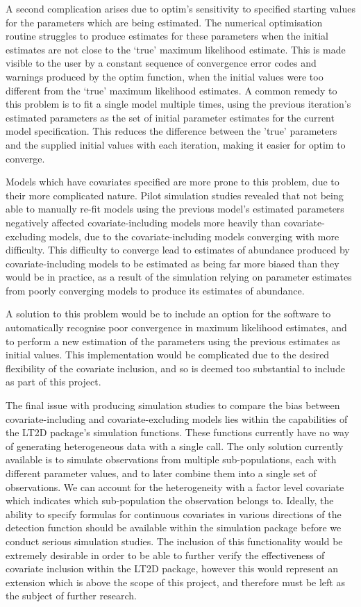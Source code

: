 \documentclass[11pt]{article}
\begin{document}
\begin{multicols}{2}
A second complication arises due to optim's sensitivity to specified starting values for the parameters which are being estimated. The numerical optimisation routine struggles to produce estimates for these parameters when the initial estimates are not close to the `true' maximum likelihood estimate. This is made visible to the user by a constant sequence of convergence error codes and warnings produced by the optim function, when the initial values were too different from the `true' maximum likelihood estimates. A common remedy to this problem is to fit a single model multiple times, using the previous iteration's estimated parameters as the set of initial parameter estimates for the current model specification. This reduces the difference between the 'true' parameters and the supplied initial values with each iteration, making it easier for optim to converge.

Models which have covariates specified are more prone to this problem, due to their more complicated nature. Pilot simulation studies revealed that not being able to manually re-fit models using the previous model's estimated parameters negatively affected covariate-including models more heavily than covariate-excluding models, due to the covariate-including models converging with more difficulty. This difficulty to converge lead to estimates of abundance produced by covariate-including models to be estimated as being far more biased than they would be in practice, as a result of the simulation relying on parameter estimates from poorly converging models to produce its estimates of abundance.

A solution to this problem would be to include an option for the software to automatically recognise poor convergence in maximum likelihood estimates, and to perform a new estimation of the parameters using the previous estimates as initial values. This implementation would be complicated due to the desired flexibility of the covariate inclusion, and so is deemed too substantial to include as part of this project.

The final issue with producing simulation studies to compare the bias between covariate-including and covariate-excluding models lies within the capabilities of the LT2D package's simulation functions. These functions currently have no way of generating heterogeneous data with a single call. The only solution currently available is to simulate observations from multiple sub-populations, each with different parameter values, and to later combine them into a single set of observations. We can account for the heterogeneity with a factor level covariate which indicates which sub-population the observation belongs to. Ideally, the ability to specify formulas for continuous covariates in various directions of the detection function should be available within the simulation package before we conduct serious simulation studies. The inclusion of this functionality would be extremely desirable in order to be able to further verify the effectiveness of covariate inclusion within the LT2D package, however this would represent an extension which is above the scope of this project, and therefore must be left as the subject of further research. 



\end{multicols}
\end{document}
